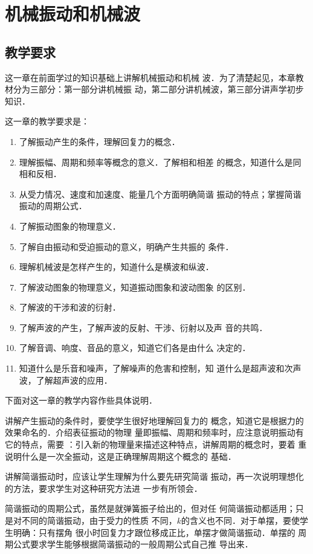 
\chapter{机械振动和机械波}
\minitoc[n]
\section{教学要求}


这一章在前面学过的知识基础上讲解机械振动和机械
波．为了清楚起见，本章教材分为三部分：第一部分讲机械振
动，第二部分讲机械波，第三部分讲声学初步知识．

这一章的教学要求是：
\begin{enumerate}
\item 了解振动产生的条件，理解回复力的概念．
\item 理解振幅、周期和频率等概念的意义．了解相和相差
的概念，知道什么是同相和反相．
\item 从受力情况、速度和加速度、能量几个方面明确简谐
振动的特点；掌握简谐振动的周期公式．
\item 了解振动图象的物理意义．
\item 了解自由振动和受迫振动的意义，明确产生共振的
条件．
\item 理解机械波是怎样产生的，知道什么是横波和纵波．
\item 了解波动图象的物理意义，知道振动图象和波动图象
的区别．
\item 了解波的干涉和波的衍射．
\item 了解声波的产生，了解声波的反射、干涉、衍射以及声
音的共鸣．
\item 了解音调、响度、音品的意义，知道它们各是由什么
决定的．
\item 知道什么是乐音和噪声，了解噪声的危害和控制，知
道什么是超声波和次声波，了解超声波的应用．
\end{enumerate}

下面对这一章的教学内容作些具体说明．

讲解产生振动的条件时，要使学生很好地理解回复力的
概念，知道它是根据力的效果命名的．介绍表征振动的物理
量即振幅、周期和频率时，应注意说明振动有它的特点，需要
：引入新的物理量来描述这种特点，讲解周期的概念时，要着
重说明什么是一次全振动，这是正确理解周期这个概念的
基础．

讲解简谐振动时，应该让学生理解为什么要先研究简谐
振动，再一次说明理想化的方法，要求学生对这种研究方法进
一步有所领会．

简谐振动的周期公式，虽然是就弹簧振子给出的，但对任
何简谐振动都适用；只是对不同的简谐振动，由于受力的性质
不同，$k$的含义也不同．对于单摆，要使学生明确：只有摆角
很小时回复力才跟位移成正比，单摆才做简谐振动．单摆的
周期公式要求学生能够根据简谐振动的一般周期公式自己推
导出来．

